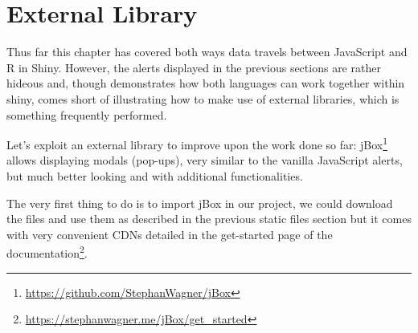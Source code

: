 \documentclass[
]{krantz}
\makeatletter
\newenvironment{Shaded}{\begin{snugshade}}{\end{snugshade}}
\newcommand{\CommentTok}[1]{\textcolor[rgb]{0.37,0.37,0.37}{\textit{#1}}}
\newcommand{\ControlFlowTok}[1]{\textcolor[rgb]{0.27,0.27,0.27}{\textbf{#1}}}
\newcommand{\DataTypeTok}[1]{\textcolor[rgb]{0.27,0.27,0.27}{#1}}
\newcommand{\KeywordTok}[1]{\textcolor[rgb]{0.27,0.27,0.27}{\textbf{#1}}}
\newcommand{\NormalTok}[1]{#1}
\newcommand{\OperatorTok}[1]{\textcolor[rgb]{0.43,0.43,0.43}{\textbf{#1}}}
\newcommand{\StringTok}[1]{\textcolor[rgb]{0.5,0.5,0.5}{#1}}
\renewcommand{\href}[2]{#2\footnote{\url{#1}}}
\newenvironment{kframe}{%
\medskip{}
\setlength{\fboxsep}{.8em}
 \def\at@end@of@kframe{}%
 \ifinner\ifhmode%
  \def\at@end@of@kframe{\end{minipage}}%
  \begin{minipage}{\columnwidth}%
 \fi\fi%
 \def\FrameCommand##1{\hskip\@totalleftmargin \hskip-\fboxsep
 \colorbox{shadecolor}{##1}\hskip-\fboxsep
     \hskip-\linewidth \hskip-\@totalleftmargin \hskip\columnwidth}%
 \MakeFramed {\advance\hsize-\width
   \@totalleftmargin\z@ \linewidth\hsize
   \@setminipage}}%
 {\par\unskip\endMakeFramed%
 \at@end@of@kframe}
\renewenvironment{Shaded}{\begin{kframe}}{\end{kframe}}
\makeatother
\begin{document}
\begin{Shaded}
\end{Shaded}

\hypertarget{external-library}{%
\section*{External Library}\label{external-library}}


Thus far this chapter has covered both ways data travels between JavaScript and R in Shiny. However, the alerts displayed in the previous sections are rather hideous and, though demonstrates how both languages can work together within shiny, comes short of illustrating how to make use of external libraries, which is something frequently performed.

Let's exploit an external library to improve upon the work done so far: \href{https://github.com/StephanWagner/jBox}{jBox} allows displaying modals (pop-ups), very similar to the vanilla JavaScript alerts, but much better looking and with additional functionalities.

The very first thing to do is to import jBox in our project, we could download the files and use them as described in the previous static files section but it comes with very convenient CDNs detailed in the \href{https://stephanwagner.me/jBox/get_started}{get-started page of the documentation}.
\end{document}
